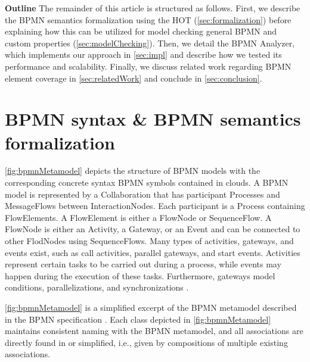 \documentclass{lmcs} %
\begin{document}
\textbf{Outline} The remainder of this article is structured as follows.
First, we describe the BPMN semantics formalization using the HOT (\autoref{sec:formalization}) before explaining how this can be utilized for model checking general BPMN and custom properties (\autoref{sec:modelChecking}).
Then, we detail the BPMN Analyzer, which implements our approach in \autoref{sec:impl} and describe how we tested its performance and scalability.
Finally, we discuss related work regarding BPMN element coverage in \autoref{sec:relatedWork} and conclude in \autoref{sec:conclusion}.



\section{BPMN syntax \& BPMN semantics formalization} \label{sec:formalization}

\autoref{fig:bpmnMetamodel} depicts the structure of BPMN models with the corresponding concrete syntax BPMN symbols contained in clouds.
A BPMN model is represented by a \textsf{Collaboration} that has participant \textsf{Process}es and \textsf{MessageFlow}s between \textsf{InteractionNode}s.
Each participant is a \textsf{Process} containing \textsf{FlowElement}s.
A \textsf{FlowElement} is either a \textsf{FlowNode} or \textsf{SequenceFlow}.
A \textsf{FlowNode} is either an \textsf{Activity}, a \textsf{Gateway}, or an \textsf{Event} and can be connected to other \textsf{FlodNode}s using \textsf{SequenceFlow}s.
Many types of activities, gateways, and events exist, such as call activities, parallel gateways, and start events.
Activities represent certain tasks to be carried out during a process, while events may happen during the execution of these tasks.
Furthermore, gateways model conditions, parallelizations, and synchronizations \cite{freundRealLifeBPMNUsing2019}.

\autoref{fig:bpmnMetamodel} is a simplified excerpt of the BPMN metamodel described in the BPMN specification \cite{objectmanagementgroupBusinessProcessModel2013}.
Each class depicted in \autoref{fig:bpmnMetamodel} maintains consistent naming with the BPMN metamodel, and all associations are directly found in \cite{objectmanagementgroupBusinessProcessModel2013} or simplified, i.e., given by compositions of multiple existing associations.
\end{document}
